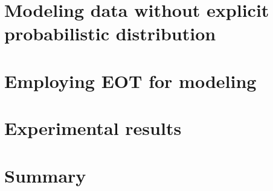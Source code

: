 \section{Modeling data without explicit probabilistic distribution}

\section{Employing EOT for modeling}

\section{Experimental results}

\section{Summary}

